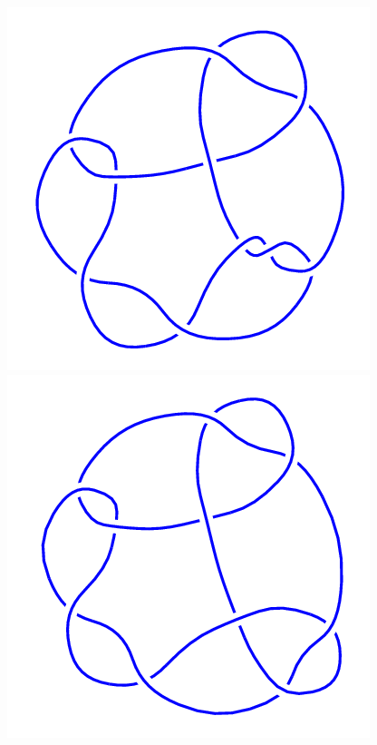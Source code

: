 \begin{figure}[H]
    \begin{minipage}[b]{.18\linewidth}
        \centering
        \includegraphics[width=\linewidth]{../data/10_77.png}
    \end{minipage}
    \begin{minipage}[b]{.18\linewidth}
        \centering
        \includegraphics[width=\linewidth]{../data/10_78.png}

\end{minipage}
\end{figure}
